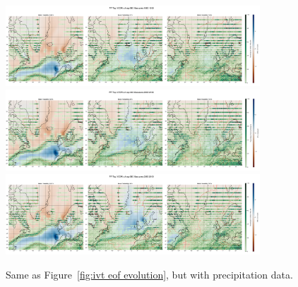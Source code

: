 \begin{figure}[htb]
  \begin{center}
    \includegraphics[width=0.85\textwidth]{figures/pr_spat_patterns_hexbin_18501899_ssp585_50seasons.png}
    \includegraphics[width=0.85\textwidth]{figures/pr_spat_patterns_hexbin_20502100_ssp126_50seasons.png}
    \includegraphics[width=0.85\textwidth]{figures/pr_spat_patterns_hexbin_20502100_ssp585_50seasons.png}
  \end{center}
  \caption{Same as Figure~\ref{fig:ivt eof evolution}, but with precipitation data.}\label{fig:pr eof evolution}
\end{figure}



